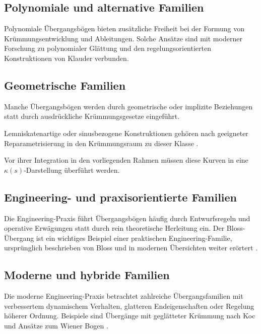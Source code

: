 \subsection{Polynomiale und alternative Familien}
Polynomiale Übergangsbögen bieten zusätzliche Freiheit bei der Formung von
Krümmungsentwicklung und Ableitungen. Solche Ansätze sind mit moderner
Forschung zu polynomialer Glättung \cite{ZboinskiWoznica2017Polynomial} und
den regelungsorientierten Konstruktionen von Klauder
\cite{Klauder2001BetterWay,Klauder2009US} verbunden.

\subsection{Geometrische Familien}
Manche Übergangsbögen werden durch geometrische oder implizite Beziehungen
statt durch ausdrückliche Krümmungsgesetze eingeführt.
\begin{example}
Lemniskatenartige oder sinusbezogene Konstruktionen gehören nach geeigneter
Reparametrisierung in den Krümmungsraum zu dieser Klasse
\cite{Pirti2016Transrapid}.
\end{example}
Vor ihrer Integration in den vorliegenden Rahmen müssen diese Kurven in eine
\(\kappa(s)\)-Darstellung überführt werden.

\subsection{Engineering- und praxisorientierte Familien}
Die Engineering-Praxis führt Übergangsbögen häufig durch Entwurfsregeln und
operative Erwägungen statt durch rein theoretische Herleitung ein. Der
Bloss-Übergang ist ein wichtiges Beispiel einer praktischen Engineering-Familie,
ursprünglich beschrieben von Bloss \cite{Bloss1978TrackGeometry} und in
modernen Übersichten weiter erörtert \cite{Ciobanu2015Bloss}.

\subsection{Moderne und hybride Familien}
Die moderne Engineering-Praxis betrachtet zahlreiche Übergangsfamilien mit
verbessertem dynamischem Verhalten, glatteren Endeigenschaften oder Regelung
höherer Ordnung. Beispiele sind Übergänge mit geglätteter Krümmung nach Koc
\cite{Koc2017SmoothedEnds,Koc2019SmoothedTransition,Koc2019Operational} und
Ansätze zum Wiener Bogen \cite{Wojtczak2017WienerBogen}.

